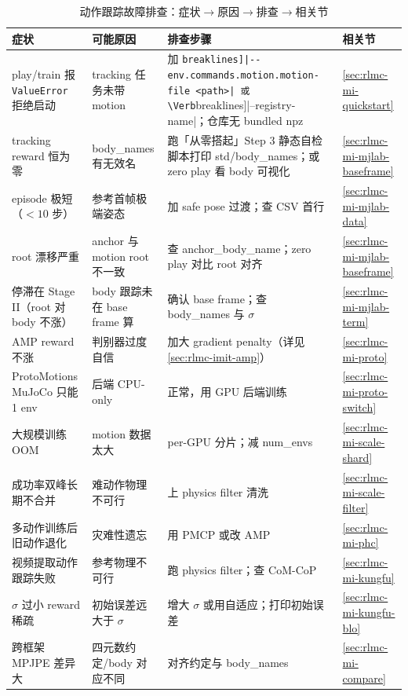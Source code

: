 \begin{table}[H]
\centering
\small
\caption{动作跟踪故障排查：症状$\to$原因$\to$排查$\to$相关节}
\label{tab:rlmc-mi-trouble}
\begin{tabular}{@{}p{3.4cm}p{3.0cm}p{4.2cm}p{2.0cm}@{}}
\toprule
症状 & 可能原因 & 排查步骤 & 相关节 \\
\midrule
play/train 报 \texttt{ValueError} 拒绝启动 & tracking 任务未带 motion & 加 \Verb[breaklines]|--env.commands.motion.motion-file <path>| 或 \Verb[breaklines]|--registry-name|；仓库无 bundled npz & \cref{sec:rlmc-mi-quickstart} \\
tracking reward 恒为零 & body\_names 有无效名 & 跑「从零搭起」Step 3 静态自检脚本打印 std/body\_names；或 zero play 看 body 可视化 & \cref{sec:rlmc-mi-mjlab-baseframe} \\
episode 极短（$<10$ 步） & 参考首帧极端姿态 & 加 safe pose 过渡；查 CSV 首行 & \cref{sec:rlmc-mi-mjlab-data} \\
root 漂移严重 & anchor 与 motion root 不一致 & 查 anchor\_body\_name；zero play 对比 root 对齐 & \cref{sec:rlmc-mi-mjlab-baseframe} \\
停滞在 Stage II（root 对 body 不涨） & body 跟踪未在 base frame 算 & 确认 base frame；查 body\_names 与 $\sigma$ & \cref{sec:rlmc-mi-mjlab-term} \\
AMP reward 不涨 & 判别器过度自信 & 加大 gradient penalty（详见 \cref{sec:rlmc-imit-amp}） & \cref{sec:rlmc-mi-proto} \\
ProtoMotions MuJoCo 只能 1 env & 后端 CPU-only & 正常，用 GPU 后端训练 & \cref{sec:rlmc-mi-proto-switch} \\
大规模训练 OOM & motion 数据太大 & per-GPU 分片；减 num\_envs & \cref{sec:rlmc-mi-scale-shard} \\
成功率双峰长期不合并 & 难动作物理不可行 & 上 physics filter 清洗 & \cref{sec:rlmc-mi-scale-filter} \\
多动作训练后旧动作退化 & 灾难性遗忘 & 用 PMCP 或改 AMP & \cref{sec:rlmc-mi-phc} \\
视频提取动作跟踪失败 & 参考物理不可行 & 跑 physics filter；查 CoM-CoP & \cref{sec:rlmc-mi-kungfu} \\
$\sigma$ 过小 reward 稀疏 & 初始误差远大于 $\sigma$ & 增大 $\sigma$ 或用自适应；打印初始误差 & \cref{sec:rlmc-mi-kungfu-blo} \\
跨框架 MPJPE 差异大 & 四元数约定/body 对应不同 & 对齐约定与 body\_names & \cref{sec:rlmc-mi-compare} \\
\bottomrule
\end{tabular}
\end{table}

